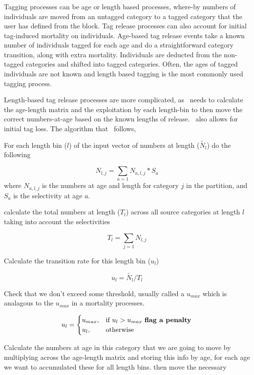 \subsubsection{}\label{sub:tag_release}
Tagging processes can be age or length based processes, where-by numbers of individuals are moved from an untagged category to a tagged category that the user has defined from the  block. Tag release processes can also account for initial tag-induced mortality on individuals. Age-based tag release events take a known number of individuals tagged for each age and do a straightforward category transition, along with extra mortality. Individuals are deducted from the non-tagged categories and shifted into tagged categories. Often, the ages of tagged individuals are not known and length based tagging is the most commonly used tagging process.


Length-based tag release processes are more complicated, as \CNAME\ needs to calculate the age-length matrix and the exploitation by each length-bin to then move the correct numbers-at-age based on the known lengths of release. \CNAME\ also allows for initial tag loss. The algorithm that \CNAME\ follows,


For each length bin ($l$) of the input vector of numbers at length ($\tilde{N_l}$) do the following

$$N_{l,j} = \sum_{a = 1}N_{a,l,j} * S_a$$
where $N_{a,l,j}$ is the numbers at age and length for category $j$ in the partition, and $S_a$ is the selectivity at age $a$.


calculate the total numbers at length ($T_l$) across all source categories at length $l$ taking into account the selectivities 

$$T_l = \sum_{j = 1}N_{l,j}$$

Calculate the transition rate for this length bin ($u_l$)

$$u_{l} = \tilde{N_l} / T_l$$



Check that we don't exceed some threshold, usually called a $u_{max}$ which is analagous to the $u_{max}$ in a mortality processes.

\[
u_{l} = 
\begin{cases}
u_{max},& \text{if } u_{l} > u_{max} \text{ \textbf{flag a penalty}}\\
u_{l},  & \text{otherwise}
\end{cases}
\]

Calculate the numbers at age in this category that we are going to move by multiplying across the age-length matrix and storing this info by age, for each age we want to accumulated these for all length bins. then move the necessary 

